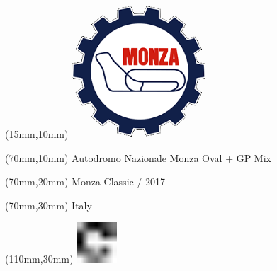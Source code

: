 \null\newpage
\begin{textblock*}{50mm}(15mm,10mm)%
\includegraphics[width=50mm]{LG/MON.png}
\end{textblock*}
\begin{textblock*}{130mm}(70mm,10mm)%
{\fontsize{20}{20}\selectfont Autodromo Nazionale Monza Oval + GP Mix}\\
\end{textblock*}
\begin{textblock*}{120mm}(70mm,20mm)%
{\fontsize{16}{16}\selectfont Monza Classic / 2017}\\
\end{textblock*}
\begin{textblock*}{120mm}(70mm,30mm)%
{\fontsize{12}{12}\selectfont Italy}
\end{textblock*}
\begin{textblock*}{30mm}(110mm,30mm)%
\centering
\includegraphics[height=15mm]{icons/fa-rotate-right.pdf}
\end{textblock*}
